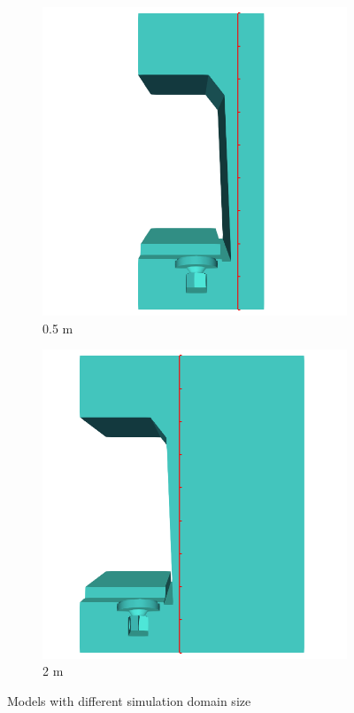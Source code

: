 \begin{figure}[H]
	\centering
	\begin{subfigure}[b]{0.45\textwidth}
		\centering
		\includegraphics[width=\linewidth]{fig/chap4/simulation_domain/0pt5m.png}
		\caption{0.5 m}
	\end{subfigure}
	\hfill
	\begin{subfigure}[b]{0.45\textwidth}
		\centering
		\includegraphics[width=\linewidth]{fig/chap4/simulation_domain/2m.png}
		\caption{2 m}
	\end{subfigure}
	\caption{Models with different simulation domain size}
	\label{fig:domain_size_variation}
\end{figure}

